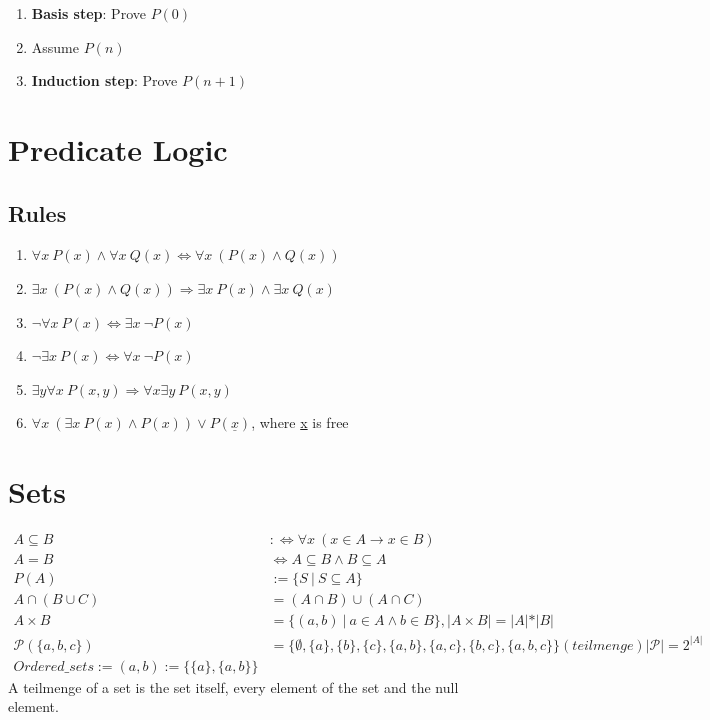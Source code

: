 \documentclass[11pt]{article}
\begin{document}
\begin{enumerate}
	\item \textbf{Basis step}: Prove $P(0)$
	\item Assume $P(n)$
	\item \textbf{Induction step}: Prove $P(n + 1)$
\end{enumerate}

\section{Predicate Logic}

\subsection{Rules}

\begin{enumerate}[labelindent=16pt,style=multiline,leftmargin=1.5cm, noitemsep]
	\item $\forall x\ P(x) \land \forall x\ Q(x) \Leftrightarrow \forall x\ (P(x) \land Q(x))$
	\item $\exists x\ (P(x) \land Q(x)) \Rightarrow \exists x\ P(x) \land \exists x\ Q(x)$
	\item $\neg\forall x\ P(x) \Leftrightarrow \exists x\ \neg P(x)$
	\item $\neg\exists x\ P(x) \Leftrightarrow \forall x \ \neg P(x)$
	\item $\exists y \forall x\ P(x, y) \Rightarrow \forall x \exists y\ P(x, y)$
	\item $\forall x\ (\exists x\ P(x) \land P(x)) \lor P(\underline{x})$, where \underline{x} is free
\end{enumerate}

\section{Sets}

\begin{equation*}
\begin{split}
	A \subseteq B & :\Leftrightarrow \forall x\ (x \in A \rightarrow x \in B) \\
	A = B & \Leftrightarrow A \subseteq B \land B \subseteq A \\
	P(A) & := \{S\ |\ S \subseteq A\} \\
	A \cap (B \cup C) & = (A \cap B) \cup (A \cap C) \\
	A \times B & = \{(a, b)\ |\ a \in A \land b \in B\} ,|A\times B| = |A|*|B|\\ 
	\mathcal{P}(\{a,b,c\}) & = \{\emptyset, \{a\}, \{b\}, \{c\}, \{a,b\}, \{a,c\}, \{b,c\}, \{a,b,c\}\} (teilmenge) |\mathcal{P}|=2^{|A|}\\
	 Ordered\_sets:= (a,b):=\{\{a\},\{a,b\}\}
\end{split}
\end{equation*}
A teilmenge of a set is the set itself, every element of the set and the null element.
\end{document}
